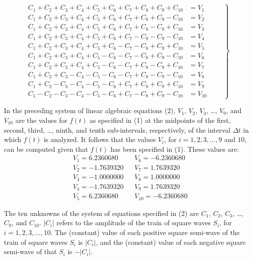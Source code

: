 \documentclass[11pt]{rMTA2010} \usepackage[utf8]{inputenc} \usepackage{graphicx} \usepackage{booktabs} \usepackage{array} \usepackage{enumerate}
\begin{document}
\begin{equation}
  \left.\begin{aligned}
C_1 + C_2 + C_3 + C_4 + C_5 + C_6 + C_7 + C_8 + C_9 + C_{10} &= V_1 \\
C_1 + C_2 + C_3 + C_4 + C_5 + C_6 + C_7 + C_8 + C_9 - C_{10} &= V_2 \\
C_1 + C_2 + C_3 + C_4 + C_5 + C_6 + C_7 + C_8 - C_9 + C_{10} &= V_3 \\
C_1 + C_2 + C_3 + C_4 + C_5 + C_6 + C_7 - C_8 - C_9 - C_{10} &= V_4 \\
C_1 + C_2 + C_3 + C_4 + C_5 + C_6 - C_7 - C_8 + C_9 + C_{10} &= V_5 \\
C_1 + C_2 + C_3 + C_4 + C_5 - C_6 - C_7 - C_8 + C_9 - C_{10} &= V_6 \\
C_1 + C_2 + C_3 + C_4 + C_5 - C_6 - C_7 + C_8 - C_9 + C_{10} &= V_7 \\
C_1 + C_2 + C_3 - C_4 - C_5 - C_6 - C_7 + C_8 - C_9 - C_{10} &= V_8 \\
C_1 + C_2 - C_3 - C_4 - C_5 - C_6 + C_7 + C_8 + C_9 + C_{10} &= V_9 \\
C_1 - C_2 - C_3 - C_4 - C_5 - C_6 + C_7 - C_8 + C_9 - C_{10} &= V_{10}
   \end{aligned}
  \qquad \right\}
\end{equation}

In the preceding system of linear algebraic equations (2), $V_1$, $V_2$, $V_3$, \ldots, $V_9$, and $V_{10}$ are the values for $f(t)$ as specified in (1) at the midpoints of the first, second, third, \ldots, ninth, and tenth sub-intervals, respectively, of the interval $\Delta t$ in which $f(t)$ is analyzed. It follows that the values $V_i$, for $i = 1,2, 3,\ldots, 9$ and $10$, can be computed given that $f(t)$ has been specified in (1). These values are:
\begin{align*}
& V_1 = 6.2360680 & &  V_6 = -6.2360680  \\
& V_2 = -1.7639320 & & V_7 = 1.7639320  \\
& V_3 = -1.0000000 & & V_8 = 1.0000000  \\
& V_4 = -1.7639320 & & V_9 = 1.7639320  \\
& V_5 = 6.2360680 & & V_{10} = -6.2360680
\end{align*}

The ten unknowns of the system of equations specified in (2) are $C_1$, $C_2$, $C_3$, \ldots, $C_9$, and $C_{10}$. $|C_i|$ refers to the amplitude of the train of square waves $S_i$, for $i = 1, 2, 3,\ldots,10$. The (constant) value of each positive square semi-wave of the train of square waves $S_i$ is $|C_i|$, and the (constant) value of each negative square semi-wave of that $S_i$ is $-|C_i|$.
\end{document}
